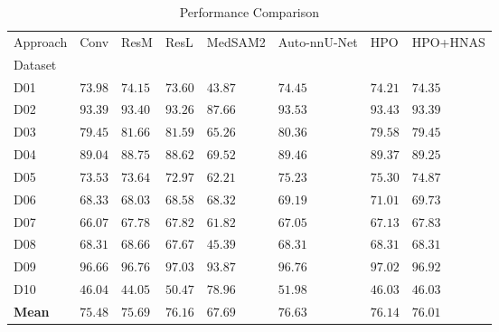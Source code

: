 \begin{table}
\caption{Performance Comparison}
\label{tab:results}
\begin{tabular}{llllllll}
\toprule
Approach & Conv & ResM & ResL & MedSAM2 & Auto-nnU-Net & HPO & HPO+HNAS \\
Dataset &  &  &  &  &  &  &  \\
\midrule
D01 & $73.98$ & $74.15$ & $73.60$ & $43.87$ & $\mathbf{74.45}$ & $74.21$ & $74.35$ \\
D02 & $93.39$ & $93.40$ & $93.26$ & $87.66$ & $\mathbf{93.53}$ & $93.43$ & $93.39$ \\
D03 & $79.45$ & $\mathbf{81.66}$ & $81.59$ & $65.26$ & $80.36$ & $79.58$ & $79.45$ \\
D04 & $89.04$ & $88.75$ & $88.62$ & $69.52$ & $\mathbf{89.46}$ & $89.37$ & $89.25$ \\
D05 & $73.53$ & $73.64$ & $72.97$ & $62.21$ & $75.23$ & $\mathbf{75.30}$ & $74.87$ \\
D06 & $68.33$ & $68.03$ & $68.58$ & $68.32$ & $69.19$ & $\mathbf{71.01}$ & $69.73$ \\
D07 & $66.07$ & $67.78$ & $67.82$ & $61.82$ & $67.05$ & $67.13$ & $\mathbf{67.83}$ \\
D08 & $68.31$ & $\mathbf{68.66}$ & $67.67$ & $45.39$ & $68.31$ & $68.31$ & $68.31$ \\
D09 & $96.66$ & $96.76$ & $\mathbf{97.03}$ & $93.87$ & $96.76$ & $97.02$ & $96.92$ \\
D10 & $46.04$ & $44.05$ & $50.47$ & $\mathbf{78.96}$ & $51.98$ & $46.03$ & $46.03$ \\
\textbf{Mean} & $75.48$ & $75.69$ & $76.16$ & $67.69$ & $\mathbf{76.63}$ & $76.14$ & $76.01$ \\
\bottomrule
\end{tabular}
\end{table}
